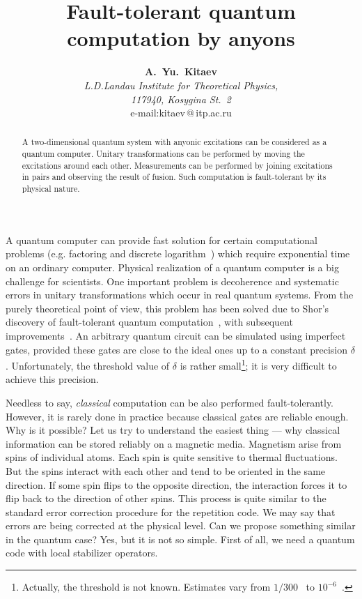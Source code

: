 \documentclass[12pt]{article}
\title{Fault-tolerant quantum computation by anyons}
\author{ \textbf{A.~Yu.~Kitaev}\medskip\\
\textit{L.D.Landau Institute for Theoretical Physics,} \\
\textit{117940, Kosygina St.~2}\smallskip \\
e-mail:\quad kitaev\,@\,itp.ac.ru
\vspace{1cm} }
\begin{document}
\maketitle

\begin{abstract}
A two-dimensional quantum system with anyonic excitations can be considered
as a quantum computer. Unitary transformations can be performed by moving
the excitations around each other. Measurements can be performed by joining
excitations in pairs and observing the result of fusion. Such 
computation is fault-tolerant by its physical nature.
\end{abstract}



A quantum computer can provide fast solution for certain computational
problems (e.g. factoring and discrete logarithm~\cite{Shor1}) which require
exponential time on an ordinary computer. Physical realization of a quantum
computer is a big challenge for scientists. One important problem is
decoherence and systematic errors in unitary transformations which occur in
real quantum systems. From the purely theoretical point of view, this problem
has been solved due to Shor's discovery of fault-tolerant quantum
computation~\cite{Shor2}, with subsequent
improvements~\cite{KL,KLZ,Ah,Kit1}. An arbitrary quantum circuit
can be simulated using imperfect gates, provided these gates are close to the
ideal ones up to a constant precision $\delta$. Unfortunately, the threshold
value of $\delta$ is rather small\footnote{ Actually, the threshold is not
known. Estimates vary from $1/300$~\cite{Zalka} to $10^{-6}$~\cite{KLZ}.}; 
it is very difficult to achieve this precision.

Needless to say, \emph{classical} computation can be also performed 
fault-tolerantly. However, it is rarely done in practice because classical 
gates are reliable enough. Why is it possible? Let us try to 
understand the easiest thing --- why classical information can be stored 
reliably on a magnetic media. Magnetism arise from spins of individual atoms. 
Each spin is quite sensitive to thermal fluctuations. But the spins interact 
with each other and tend to be oriented in the same direction. If some spin 
flips to the opposite direction, the interaction forces it to flip back to the 
direction of other spins. This process is quite similar to the standard error 
correction procedure for the repetition code. We may say that errors are 
being corrected at the physical level. Can we propose something similar in 
the quantum case? Yes, but it is not so simple. First of all, we need a 
quantum code with local stabilizer operators. 
\end{document}
